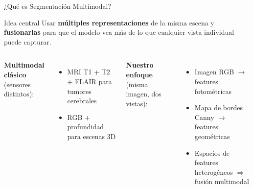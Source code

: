 \documentclass[aspectratio=169]{beamer}
\begin{document}
\begin{frame}{¿Qué es Segmentación Multimodal?}
\begin{block}{Idea central}
Usar \textbf{múltiples representaciones} de la misma escena y \textbf{fusionarlas} para que el modelo vea más de lo que cualquier vista individual puede capturar.
\end{block}
\vspace{0.6em}
\begin{columns}
\textbf{Multimodal clásico} (sensores distintos):
\begin{itemize}
    \item MRI T1 + T2 + FLAIR para tumores cerebrales
    \item RGB + profundidad para escenas 3D
\end{itemize}
\textbf{Nuestro enfoque} (misma imagen, dos vistas):
\begin{itemize}
    \item Imagen RGB $\rightarrow$ features fotométricas
    \item Mapa de bordes Canny $\rightarrow$ features geométricas
    \item Espacios de features heterogéneos $\Rightarrow$ fusión multimodal
\end{itemize}
\end{columns}
\end{frame}

\end{document}
